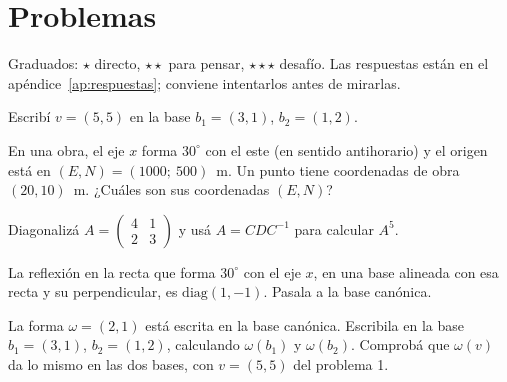 \section{Problemas}\label{sec:problemas-09}

Graduados: \({\star}\) directo, \({\star}{\star}\) para pensar, \({\star}{\star}{\star}\) desafío. Las respuestas están en el apéndice~\ref{ap:respuestas}; conviene intentarlos antes de mirarlas.

\begin{problema}[\({\star}\)]\label{pb:09-1}
Escribí \(v=(5,5)\) en la base \(b_1=(3,1)\), \(b_2=(1,2)\).
\end{problema}

\begin{problema}[\({\star}{\star}\)]\label{pb:09-2}
En una obra, el eje \(x\) forma \(30^\circ\) con el este (en sentido antihorario) y el origen está en \((E,N)=(1000;\ 500)\)~m. Un punto tiene coordenadas de obra \((20,10)\)~m. ¿Cuáles son sus coordenadas \((E,N)\)?
\end{problema}

\begin{problema}[\({\star}{\star}\)]\label{pb:09-3}
Diagonalizá \(A=\begin{pmatrix}4&1\\2&3\end{pmatrix}\) y usá \(A=CDC^{-1}\) para calcular \(A^5\).
\end{problema}

\begin{problema}[\({\star}{\star}\)]\label{pb:09-4}
La reflexión en la recta que forma \(30^\circ\) con el eje \(x\), en una base alineada con esa recta y su perpendicular, es \(\mathrm{diag}(1,-1)\). Pasala a la base canónica.
\end{problema}

\begin{problema}[\({\star}{\star}{\star}\)]\label{pb:09-5}
La forma \(\omega=(2,1)\) está escrita en la base canónica. Escribila en la base \(b_1=(3,1)\), \(b_2=(1,2)\), calculando \(\omega(b_1)\) y \(\omega(b_2)\). Comprobá que \(\omega(v)\) da lo mismo en las dos bases, con \(v=(5,5)\) del problema 1.
\end{problema}
